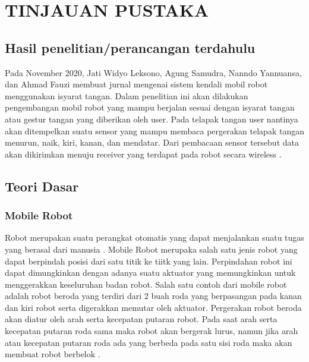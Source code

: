 \section{TINJAUAN PUSTAKA}

\subsection{Hasil penelitian/perancangan terdahulu}
Pada November 2020, Jati Widyo Leksono, Agung Samudra, Nanndo Yannuansa, dan Ahmad Fauzi membuat jurnal mengenai sistem kendali mobil robot menggunakan isyarat tangan. Dalam penelitian ini akan dilakukan pengembangan mobil robot yang mampu berjalan sesuai dengan isyarat tangan atau gestur tangan yang diberikan oleh user. Pada telapak tangan user nantinya akan ditempelkan suatu sensor yang mampu membaca pergerakan telapak tangan menurun, naik, kiri, kanan, dan mendatar. Dari pembacaan sensor tersebut data akan dikirimkan menuju receiver yang terdapat pada robot secara wireless \parencite{JurnalElectroLuecat}.

\subsection{Teori Dasar}

\subsubsection{Mobile Robot}
Robot merupakan suatu perangkat otomatis yang dapat menjalankan suatu tugas yang berasal dari manusia \parencite{Desainrobot}.
Mobile Robot merupaka salah satu jenis robot yang dapat berpindah posisi dari satu titik ke tiitk yang lain. Perpindahan robot ini dapat dimungkinkan dengan adanya suatu aktuator yang memungkinkan untuk menggerakkan keseluruhan badan robot. Salah satu contoh dari mobile robot adalah robot beroda yang terdiri dari 2 buah roda yang berpasangan pada kanan dan kiri robot serta digerakkan memutar oleh aktuator. Pergerakan robot beroda akan diatur oleh arah serta kecepatan putaran robot. Pada saat arah serta kecepatan putaran roda sama maka robot akan bergerak lurus, namun jika arah atau kecepatan putaran roda ada yang berbeda pada satu sisi roda maka akan membuat robot berbelok \parencite{mobilerobot}.

